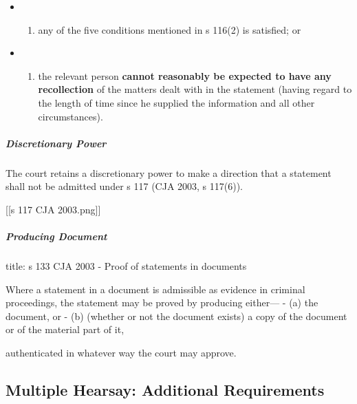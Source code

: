 \documentclass[
]{article}
\newenvironment{Shaded}{}{}
\newcommand{\NormalTok}[1]{#1}
\providecommand{\tightlist}{%
  \setlength{\itemsep}{0pt}\setlength{\parskip}{0pt}}
\begin{document}
\begin{itemize}
\item
  \begin{enumerate}
  \def\labelenumi{(\alph{enumi})}
  \tightlist
  \item
    any of the five conditions mentioned in s 116(2) is satisfied; or
  \end{enumerate}
\item
  \begin{enumerate}
  \def\labelenumi{(\alph{enumi})}
  \setcounter{enumi}{1}
  \tightlist
  \item
    the relevant person \textbf{cannot reasonably be expected to have
    any recollection} of the matters dealt with in the statement (having
    regard to the length of time since he supplied the information and
    all other circumstances).
  \end{enumerate}
\end{itemize}

\hypertarget{discretionary-power}{%
\subparagraph{Discretionary Power}\label{discretionary-power}}

The court retains a discretionary power to make a direction that a
statement shall not be admitted under s 117 (CJA 2003, s 117(6)).

{[}{[}s 117 CJA 2003.png{]}{]}

\hypertarget{producing-document}{%
\subparagraph{Producing Document}\label{producing-document}}

\begin{Shaded}
\begin{Highlighting}[]
\NormalTok{title: s 133 CJA 2003 {-} Proof of statements in documents}

\NormalTok{Where a statement in a document is admissible as evidence in criminal proceedings, the statement may be proved by producing either—}
\NormalTok{{-} (a) the document, or}
\NormalTok{{-} (b) (whether or not the document exists) a copy of the document or of the material part of it,}

\NormalTok{authenticated in whatever way the court may approve. }
\end{Highlighting}
\end{Shaded}

\hypertarget{multiple-hearsay-additional-requirements}{%
\subsection{Multiple Hearsay: Additional
Requirements}\label{multiple-hearsay-additional-requirements}}
\end{document}
